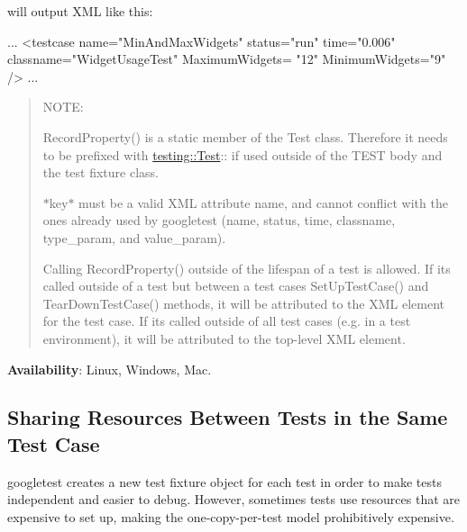 will output X\+ML like this\+:


\begin{DoxyCode}
...
  <\textcolor{keywordtype}{testcase} \textcolor{keyword}{name}=\textcolor{stringliteral}{"MinAndMaxWidgets"} \textcolor{keyword}{status}=\textcolor{stringliteral}{"run"} \textcolor{keyword}{time}=\textcolor{stringliteral}{"0.006"} \textcolor{keyword}{classname}=\textcolor{stringliteral}{"WidgetUsageTest"} \textcolor{keyword}{MaximumWidgets}=\textcolor{stringliteral}{
      "12"} \textcolor{keyword}{MinimumWidgets}=\textcolor{stringliteral}{"9"} />
...
\end{DoxyCode}


\begin{quote}
N\+O\+TE\+:


\begin{DoxyItemize}
\item {\ttfamily Record\+Property()} is a static member of the {\ttfamily Test} class. Therefore it needs to be prefixed with {\ttfamily \mbox{\hyperlink{classtesting_1_1_test}{testing\+::\+Test}}\+:\+:} if used outside of the {\ttfamily T\+E\+ST} body and the test fixture class.
\item {\ttfamily $\ast$key$\ast$} must be a valid X\+ML attribute name, and cannot conflict with the ones already used by googletest ({\ttfamily name}, {\ttfamily status}, {\ttfamily time}, {\ttfamily classname}, {\ttfamily type\+\_\+param}, and {\ttfamily value\+\_\+param}).
\item Calling {\ttfamily Record\+Property()} outside of the lifespan of a test is allowed. If it\textquotesingle{}s called outside of a test but between a test case\textquotesingle{}s {\ttfamily Set\+Up\+Test\+Case()} and {\ttfamily Tear\+Down\+Test\+Case()} methods, it will be attributed to the X\+ML element for the test case. If it\textquotesingle{}s called outside of all test cases (e.\+g. in a test environment), it will be attributed to the top-\/level X\+ML element. 
\end{DoxyItemize}\end{quote}


{\bfseries Availability}\+: Linux, Windows, Mac.

\subsection*{Sharing Resources Between Tests in the Same Test Case}

googletest creates a new test fixture object for each test in order to make tests independent and easier to debug. However, sometimes tests use resources that are expensive to set up, making the one-\/copy-\/per-\/test model prohibitively expensive.

